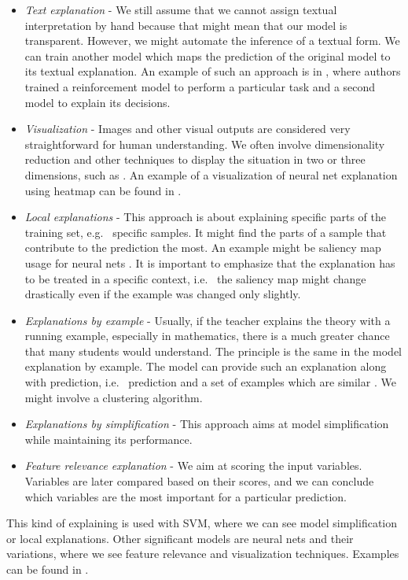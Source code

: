 \begin{itemize}
    \itemsep0em 
    \item \emph{Text explanation} - We still assume that we cannot assign textual interpretation by hand because that might mean that our model is transparent. However, we might automate the inference of a textual form. We can train another model which maps the prediction of the original model to its textual explanation. An example of such an approach is in \cite{Krening2017}, where authors trained a reinforcement model to perform a particular task and a second model to explain its decisions.
    \item \emph{Visualization} - Images and other visual outputs are considered very straightforward for human understanding. We often involve dimensionality reduction and other techniques to display the situation in two or three dimensions, such as \cite{Pearson1901}. An example of a visualization of neural net explanation using heatmap can be found in \cite{Zeiler2013}.
    \item \emph{Local explanations} - This approach is about explaining specific parts of the training set, e.g. \ specific samples. It might find the parts of a sample that contribute to the prediction the most. An example might be saliency map usage for neural nets \cite{Simonyan2014}. It is important to emphasize that the explanation has to be treated in a specific context, i.e. \ the saliency map might change drastically even if the example was changed only slightly.
    \item \emph{Explanations by example} - Usually, if the teacher explains the theory with a running example, especially in mathematics, there is a much greater chance that many students would understand. The principle is the same in the model explanation by example. The model can provide such an explanation along with prediction, i.e. \ prediction and a set of examples which are similar  \cite{Caruana1999}. We might involve a clustering algorithm.
    \item \emph{Explanations by simplification} - This approach aims at model simplification while maintaining its performance.
    \item \emph{Feature relevance explanation} - We aim at scoring the input variables. Variables are later compared based on their scores, and we can conclude which variables are the most important for a particular prediction.
\end{itemize}

This kind of explaining is used with SVM, where we can see model simplification or local explanations. Other significant models are neural nets and their variations, where we see feature relevance and visualization techniques. Examples can be found in \cite{Arrieta2019}.

